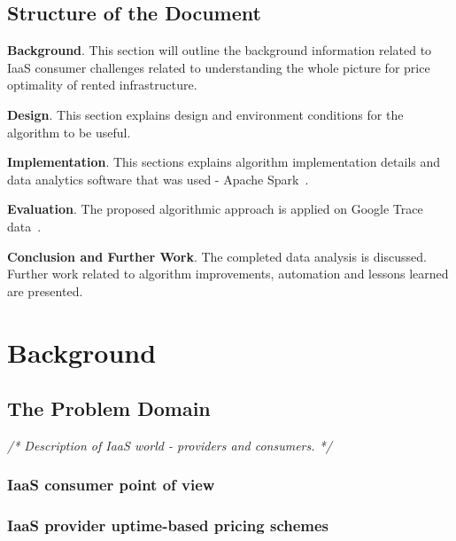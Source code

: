 \documentclass[]{final_report}
\begin{document}


\section{Structure of the Document}

\textbf{Background}. This section will outline the background information related to IaaS consumer challenges related to understanding the whole picture for price optimality of rented infrastructure. \par
\textbf{Design}. This section explains design and environment conditions for the algorithm to be useful. \par
\textbf{Implementation}. This sections explains algorithm implementation details and data analytics software that was used - Apache Spark~\cite{spark}. \par
\textbf{Evaluation}. The proposed algorithmic approach is applied on Google Trace data~\cite{googleTrace}. \par
\textbf{Conclusion and Further Work}. The completed data analysis is discussed. Further work related to algorithm improvements, automation and lessons learned are presented. 
 
\newpage


\chapter{Background}

\section{The Problem Domain}
\emph{/* Description of IaaS world - providers and consumers. */}
\subsection{IaaS consumer point of view}
\subsection{IaaS provider uptime-based pricing schemes}
\end{document}
